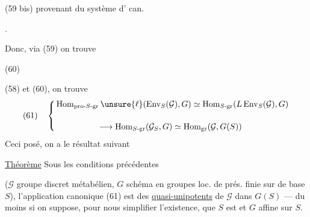 (59 bis)\quad
{}
provenant du système d' can.



.

Donc, via (59) on trouve

(60)\quad
{}


 (58) et (60), on trouve
\[
(61)\quad\left\{
\begin{aligned}
&\operatorname{Hom}_{\mathrm{pro}\text{-}S\text{-}\mathrm{gr}}\unsure{\ell}
 (\operatorname{Env}_S(\mathcal{G}),G)
 \simeq\operatorname{Hom}_{S\text{-}\mathrm{gr}}(L\operatorname{Env}_S(\mathcal{G}),G)\\[1.2em]
&\hspace{5em}\longrightarrow\operatorname{Hom}_{S\text{-}\mathrm{gr}}(\mathcal{G}_S,G)
 \simeq\operatorname{Hom}_{\mathrm{gr}}(\mathcal{G},G(S))
\end{aligned}\right.
\]
Ceci posé, on a le résultat suivant

\uline{Théorème}  Sous les conditions précédentes

($\mathcal{G}$ groupe discret métabélien, $G$ schéma en groupes loc. de prés. finie sur  de base $S$), l'application canonique (61) est    des  \uline{quasi-unipotents} de $\mathcal{G}$ dans $G(S)$ --- du moins si on suppose, pour nous simplifier l'existence, que $S$ est  et $G$ affine sur $S$.

